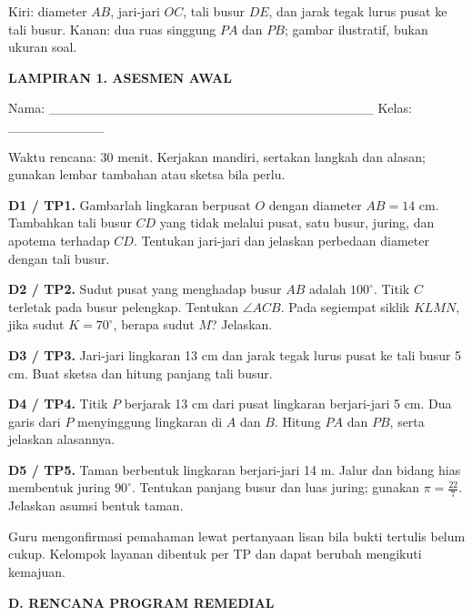 \documentclass[11pt,a4paper]{article}
\begin{document}
{\small Kiri: diameter \(AB\), jari-jari \(OC\), tali busur \(DE\), dan jarak tegak lurus pusat ke tali busur. Kanan: dua ruas singgung \(PA\) dan \(PB\); gambar ilustratif, bukan ukuran soal.\par}\medskip
\clearpage
\begin{center}\bfseries\large LAMPIRAN 1. ASESMEN AWAL\end{center}\medskip
{\small Nama: \_\_\_\_\_\_\_\_\_\_\_\_\_\_\_\_\_\_\_\_\_\_\_\_\_\_\_\_\_\_\_\_\_\_  Kelas: \_\_\_\_\_\_\_\_\_\_\par}\medskip
{\small Waktu rencana: 30 menit. Kerjakan mandiri, sertakan langkah dan alasan; gunakan lembar tambahan atau sketsa bila perlu.\par}\medskip
\noindent\textbf{D1 / TP1.} Gambarlah lingkaran berpusat \(O\) dengan diameter \(AB=14\) cm. Tambahkan tali busur \(CD\) yang tidak melalui pusat, satu busur, juring, dan apotema terhadap \(CD\). Tentukan jari-jari dan jelaskan perbedaan diameter dengan tali busur.\par\vspace{10mm}
\noindent\textbf{D2 / TP2.} Sudut pusat yang menghadap busur \(AB\) adalah \(100^\circ\). Titik \(C\) terletak pada busur pelengkap. Tentukan \(\angle ACB\). Pada segiempat siklik \(KLMN\), jika sudut \(K=70^\circ\), berapa sudut \(M\)? Jelaskan.\par\vspace{10mm}
\noindent\textbf{D3 / TP3.} Jari-jari lingkaran 13 cm dan jarak tegak lurus pusat ke tali busur 5 cm. Buat sketsa dan hitung panjang tali busur.\par\vspace{10mm}
\noindent\textbf{D4 / TP4.} Titik \(P\) berjarak 13 cm dari pusat lingkaran berjari-jari 5 cm. Dua garis dari \(P\) menyinggung lingkaran di \(A\) dan \(B\). Hitung \(PA\) dan \(PB\), serta jelaskan alasannya.\par\vspace{10mm}
\noindent\textbf{D5 / TP5.} Taman berbentuk lingkaran berjari-jari 14 m. Jalur dan bidang hias membentuk juring \(90^\circ\). Tentukan panjang busur dan luas juring; gunakan \(\pi=\frac{22}{7}\). Jelaskan asumsi bentuk taman.\par\vspace{10mm}
{\small Guru mengonfirmasi pemahaman lewat pertanyaan lisan bila bukti tertulis belum cukup. Kelompok layanan dibentuk per TP dan dapat berubah mengikuti kemajuan.\par}\medskip
\clearpage
\begin{center}\bfseries\large D. RENCANA PROGRAM REMEDIAL\end{center}\medskip
\end{document}
